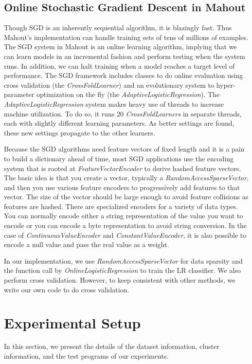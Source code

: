 \documentclass[10pt, conference, compsocconf]{IEEEtran}
\begin{document}
\subsection{Online Stochastic Gradient Descent in Mahout}
Though SGD is an inherently sequential algorithm, it is blazingly fast. Thus Mahout's implementation can handle training sets of tens of millions of examples.
The SGD system in Mahout is an online learning algorithm, implying that we can learn models in an incremental fashion and perform testing when the system runs.
In addition, we can halt training when a model reaches a target level of performance.
The SGD framework includes classes to do online evaluation using cross validation (the \textit{CrossFoldLearner}) and an evolutionary system to hyper-parameter optimization on the fly (the \textit{AdaptiveLogisticRegression}).
The \textit{AdaptiveLogisticRegression} system makes heavy use of threads to increase machine utilization.
To do so, it runs 20 \textit{CrossFoldLearners} in separate threads, each with slightly different learning parameters.
As better settings are found, these new settings propagate to the other learners.

Because the SGD algorithms need feature vectors of fixed length and it is a pain to build a dictionary ahead of time, most SGD applications use the encoding system that is rooted at \textit{FeatureVectorEncoder} to derive hashed feature vectors.
The basic idea is that you create a vector, typically a \textit{RandomAccessSparseVector}, and then you use various feature encoders to progressively add features to that vector.
The size of the vector should be large enough to avoid feature collisions as features are hashed.
There are specialized encoders for a variety of data types.
You can normally encode either a string representation of the value you want to encode or you can encode a byte representation to avoid string conversion.
In the case of \textit{ContinuousValueEncoder} and \textit{ConstantValueEncoder}, it is also possible to encode a null value and pass the real value as a weight.

In our implementation, we use \textit{RandomAccessSparseVector} for data sparsity and the function call by \textit{OnlineLogisticRegression} to train the LR classifier.
We also perform cross validation. However, to keep consistent with other methods, we write our own code to do cross validation.
	
\section{Experimental Setup} \label{sec:setup}
In this section, we present the details of the dataset information, cluster information, and the test programs of our experiments.
\end{document}
